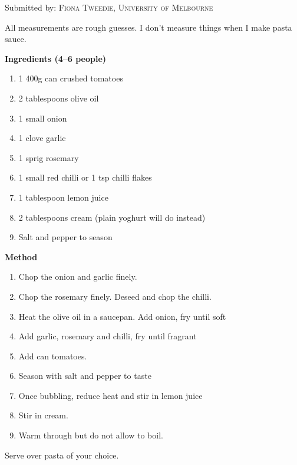 

Submitted by: \textsc{Fiona Tweedie, University of Melbourne}


\begin{shadequote*}
All measurements are rough guesses. I don't measure things when I make pasta sauce.
\end{shadequote*}
\hrulefill

\textbf{Ingredients (4--6 people)}

\begin{enumerate}[before=\itshape,font=\normalfont]
    \item 1 400g can crushed tomatoes
    \item 2 tablespoons olive oil
    \item 1 small onion
    \item 1 clove garlic
    \item 1 sprig rosemary
    \item 1 small red chilli or 1 tsp chilli flakes
    \item  1 tablespoon lemon juice
    \item 2 tablespoons cream (plain yoghurt will do instead)
    \item Salt and pepper to season
\end{enumerate}

\hrulefill

\textbf{Method}
\begin{enumerate}
    \item Chop the onion and garlic finely. 
    \item Chop the rosemary finely. Deseed and chop the chilli.
    \item Heat the olive oil in a saucepan. Add onion, fry until soft
    \item Add garlic, rosemary and chilli, fry until fragrant
    \item Add can tomatoes.
    \item Season with salt and pepper to taste
    \item Once bubbling, reduce heat and stir in lemon juice
    \item Stir in cream. 
    \item Warm through but do not allow to boil.
\end{enumerate}

Serve over pasta of your choice.


\vfill
\pagebreak
